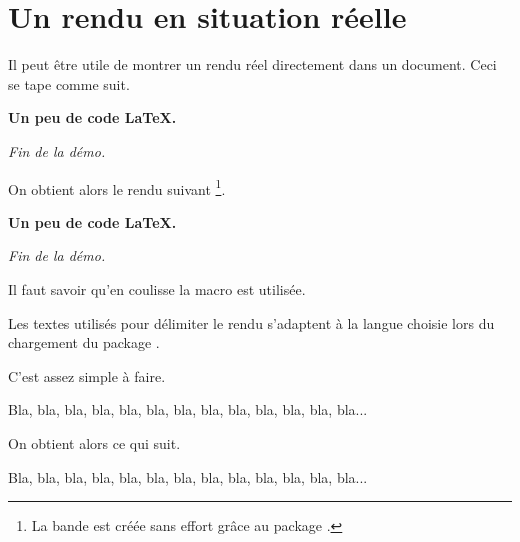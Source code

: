 \documentclass[12pt,a4paper]{article}
\begin{document}
\section{Un rendu en situation réelle}


Il peut être utile de montrer un rendu réel directement dans un document. Ceci se tape comme suit.

\begin{doclatex-alone}
\begin{docshowcase}
	\bfseries Un peu de code \LaTeX.

	\bigskip

	\itshape Fin de la démo.
\end{docshowcase}
\end{doclatex-alone}

On obtient alors le rendu suivant
\footnote{
	La bande est créée sans effort grâce au package .
}.

\medskip

\begin{docshowcase}
	\bfseries Un peu de code \LaTeX.

	\bigskip

	\itshape Fin de la démo.
\end{docshowcase}


\bigskip


Il faut savoir qu'en coulisse la macro  est utilisée.

\begin{doclatex-flat}
\end{doclatex-flat}


\begin{docrem}
	Les textes utilisés pour délimiter le rendu s'adaptent à la langue choisie lors du chargement du package .
\end{docrem}




C'est assez simple à faire.

\begin{doclatex-alone}
\begin{docshowcase}[Mon début]%
                   [Ma fin]
	Bla, bla, bla, bla, bla, bla, bla, bla, bla, bla, bla, bla, bla...
\end{docshowcase}
\end{doclatex-alone}

On obtient alors ce qui suit.

\medskip

\begin{docshowcase}[Mon début]%
                   [Ma fin]
	Bla, bla, bla, bla, bla, bla, bla, bla, bla, bla, bla, bla, bla...
\end{docshowcase}
\end{document}
